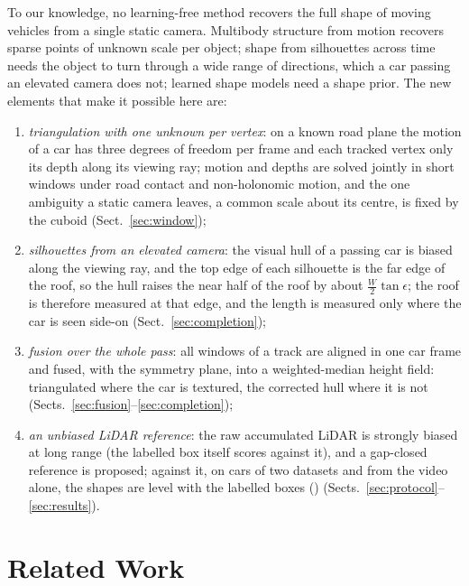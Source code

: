 \documentclass[runningheads,a4paper]{llncs}
\begin{document}
To our knowledge, no learning-free method recovers the full shape of moving vehicles from a single static camera.
Multibody structure from motion \cite{ozden2010} recovers sparse points of unknown scale per object; shape from
silhouettes across time \cite{cheung2005} needs the object to turn through a wide range of directions, which a car
passing an elevated camera does not; learned shape models \cite{kar2015,deepmanta} need a shape prior. The new elements
that make it possible here are:
\begin{enumerate}
\item \emph{triangulation with one unknown per vertex}: on a known road plane the motion of a car has three degrees of
  freedom per frame and each tracked vertex only its depth along its viewing ray; motion and depths are solved jointly
  in short windows under road contact and non-holonomic motion, and the one ambiguity a static camera leaves, a common
  scale about its centre, is fixed by the cuboid (Sect.~\ref{sec:window});
\item \emph{silhouettes from an elevated camera}: the visual hull of a passing car is biased along the viewing ray, and
  the top edge of each silhouette is the far edge of the roof, so the hull raises the near half of the roof by about
  $\tfrac{W}{2}\tan\epsilon$; the roof is therefore measured at that edge, and the length is measured only where the car
  is seen side-on (Sect.~\ref{sec:completion});
\item \emph{fusion over the whole pass}: all windows of a track are aligned in one car frame and fused, with the
  symmetry plane, into a weighted-median height field: triangulated where the car is textured, the corrected hull
  where it is not (Sects.~\ref{sec:fusion}--\ref{sec:completion});
\item \emph{an unbiased LiDAR reference}: the raw accumulated LiDAR is strongly biased at long range (the labelled box
  itself scores \ClsALabRaw{} against it), and a gap-closed reference is proposed; against it, on \ClsTCars{} cars
  of two datasets and from the video alone, the shapes are level with the labelled boxes (\ClsTDLab{}) (Sects.~\ref{sec:protocol}--\ref{sec:results}).
\end{enumerate}

\section{Related Work}
\end{document}
